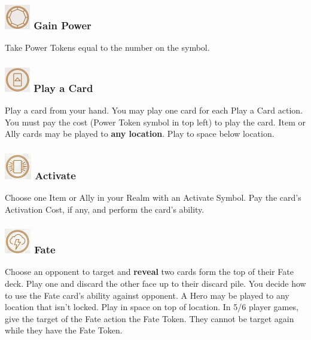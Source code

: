 \documentclass[12pt]{article}
\begin{document}
\begin{mdframed}[style = customFrame]
\begin{multicols*}{2}
    \subsubsection*{\includegraphics[scale=0.40]{images/GainPower.png}\hspace{0.1em} Gain Power}
    Take Power Tokens equal to the number on the symbol.

    \subsubsection*{\includegraphics[scale=0.40]{images/PlayCard.png}\hspace{0.1em} Play a Card}
    Play a card from your hand. You may play one card for each Play a Card action. You must pay the cost (Power Token symbol in top left) to play the card. Item or Ally cards may be played to \textbf{any location}. Play to space below location.

    \subsubsection*{\includegraphics[scale=0.40]{images/Activate.png}\hspace{0.1em} Activate}
    Choose one Item or Ally in your Realm with an Activate Symbol. Pay the card's Activation Cost, if any, and perform the card's ability.

    \subsubsection*{\includegraphics[scale=0.40]{images/Fate.png}\hspace{0.1em} Fate}
    Choose an opponent to target and \textbf{reveal} two cards form the top of their Fate deck. Play one and discard the other face up to their discard pile. You decide how to use the Fate card's ability against opponent. A Hero may be played to any location that isn't locked. Play in space on top of location. In 5/6 player games, give the target of the Fate action the Fate Token. They cannot be target again while they have the Fate Token.


\end{multicols*}
\end{mdframed}
\end{document}
